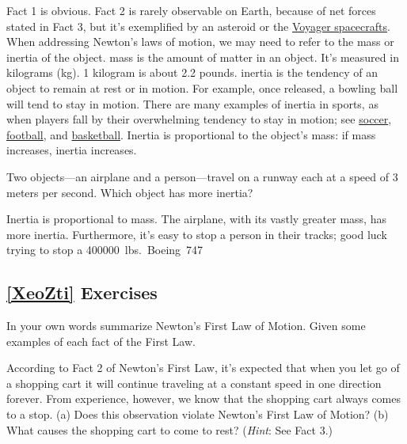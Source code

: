 \documentclass{article}
\numberwithin{equation}{section}
\numberwithin{figure}{section}
\begin{document}
Fact 1 is obvious. Fact 2 is rarely observable on Earth, because of net forces stated in Fact 3, but it's exemplified by an asteroid or the \href{https://voyager.jpl.nasa.gov/mission/status/}{Voyager spacecrafts}. When addressing Newton's laws of motion, we may need to refer to the mass or inertia of the object. \Gls{mass} is the amount of matter in an object. It's measured in kilograms (kg). 1 kilogram is about 2.2 pounds. \Gls{inertia} is the tendency of an object to remain at rest or in motion. For example, once released, a bowling ball will tend to stay in motion. There are many examples of inertia in sports, as when players fall by their overwhelming tendency to stay in motion; see \href{https://youtu.be/5PKXs8i_zSw?t=21}{soccer}, \href{https://youtu.be/4TgpW0WZZ6U?t=55}{football}, and \href{https://youtu.be/IGBpvIXGMYQ?t=26}{basketball}. Inertia is proportional to the object's mass: if mass increases, inertia increases.

\begin{example}
Two objects---an airplane and a person---travel on a runway each at a speed of 3 meters per second. Which object has more inertia?
\end{example}

\Solution Inertia is proportional to mass. The airplane, with its vastly greater mass, has more inertia. Furthermore, it's easy to stop a person in their tracks; good luck trying to stop a \SI{400000}{lbs.} Boeing 747.
\vspace{2ex}
\cyanhrule

\subsection*{\ref{XeoZti} Exercises}


\begin{exercise} \label{prob:fgm}
In your own words summarize Newton's First Law of Motion. Given some examples of each fact of the First Law. 
\end{exercise}


\begin{exercise} \label{WTFwXI}
According to Fact 2 of Newton's First Law, it's expected that when you let go of a shopping cart it will continue traveling at a constant speed in one direction forever. From experience, however, we know that the shopping cart always comes to a stop. (a) Does this observation violate Newton's First Law of Motion? (b) What causes the shopping cart to come to rest? (\textit{Hint}: See Fact 3.)
\end{exercise}
\end{document}
